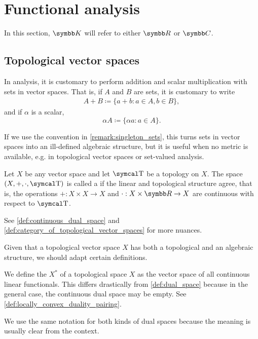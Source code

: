 \section{Functional analysis}\label{sec:functional_analysis}

In this section, \( \K \) will refer to either \( \R \) or \( \C \).

\subsection{Topological vector spaces}\label{subsec:topological_vector_spaces}

\begin{remark}\label{remark:vector_space_set_operations}
  In analysis, it is customary to perform addition and scalar multiplication with sets in vector spaces. That is, if \( A \) and \( B \) are sets, it is customary to write
  \begin{align*}
    A + B \coloneqq \{ a + b \colon a \in A, b \in B \},
  \end{align*}
  and if \( \alpha \) is a scalar,
  \begin{equation*}
    \alpha A \coloneqq \{ \alpha a \colon a \in A \}.
  \end{equation*}

  If we use the convention in \cref{remark:singleton_sets}, this turns sets in vector spaces into an ill-defined algebraic structure, but it is useful when no metric is available, e.g. in topological vector spaces or set-valued analysis.
\end{remark}

\begin{definition}\label{def:topological_vector_space}
  Let \( X \) be any vector space and let \( \T \) be a topology on \( X \). The space \( (X, +, \cdot, \T) \) is called a  if the linear and topological structure agree, that is, the operations \( +: X \times X \to X \) and \( \cdot: X \times \R \to X \) are continuous with respect to \( \T \).

  See \cref{def:continuous_dual_space} and \cref{def:category_of_topological_vector_spaces} for more nuances.
\end{definition}

Given that a topological vector space \( X \) has both a topological and an algebraic structure, we should adapt certain definitions.

\begin{definition}\label{def:continuous_dual_space}
  We define the  \( X^* \) of a topological space \( X \) as the vector space of all continuous linear functionals. This differs drastically from \cref{def:dual_space} because in the general case, the continuous dual space may be empty. See \cref{def:locally_convex_duality_pairing}.

  We use the same notation for both kinds of dual spaces because the meaning is usually clear from the context.
\end{definition}

